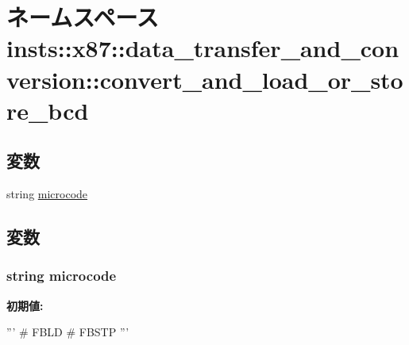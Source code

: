 \hypertarget{namespaceinsts_1_1x87_1_1data__transfer__and__conversion_1_1convert__and__load__or__store__bcd}{
\section{ネームスペース insts::x87::data\_\-transfer\_\-and\_\-conversion::convert\_\-and\_\-load\_\-or\_\-store\_\-bcd}
\label{namespaceinsts_1_1x87_1_1data__transfer__and__conversion_1_1convert__and__load__or__store__bcd}
}
\subsection*{変数}
\begin{DoxyCompactItemize}
\item 
string \hyperlink{namespaceinsts_1_1x87_1_1data__transfer__and__conversion_1_1convert__and__load__or__store__bcd_a770f11a173e99389a8802f0107ed8f52}{microcode}
\end{DoxyCompactItemize}


\subsection{変数}
\hypertarget{namespaceinsts_1_1x87_1_1data__transfer__and__conversion_1_1convert__and__load__or__store__bcd_a770f11a173e99389a8802f0107ed8f52}{
\subsubsection[{microcode}]{\setlength{\rightskip}{0pt plus 5cm}string {\bf microcode}}}
\label{namespaceinsts_1_1x87_1_1data__transfer__and__conversion_1_1convert__and__load__or__store__bcd_a770f11a173e99389a8802f0107ed8f52}
{\bfseries 初期値:}
\begin{DoxyCode}
'''
# FBLD
# FBSTP
'''
\end{DoxyCode}
